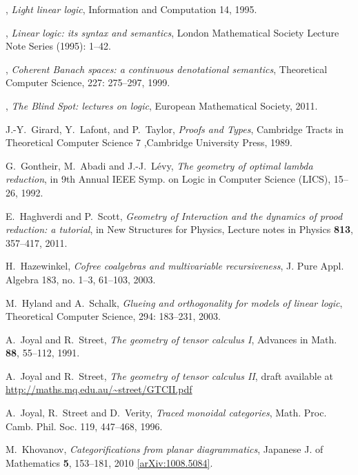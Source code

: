 \documentclass[english,letter paper,12pt,reqno]{article}
\theoremstyle{example}
\numberwithin{equation}{section}
\begin{document}
\begin{thebibliography}{BHLS03}
\bysame, \textsl{Light linear logic}, Information and Computation 14, 1995.

\bysame, \textsl{Linear logic: its syntax and semantics}, London Mathematical Society Lecture Note Series (1995): 1--42.

\bysame, \textsl{Coherent {B}anach spaces: a continuous denotational semantics}, Theoretical Computer Science, 227: 275--297, 1999.

\bysame, \textsl{The Blind Spot: lectures on logic}, European Mathematical Society, 2011.

J.-Y.~Girard, Y.~Lafont, and P.~Taylor, \textsl{Proofs and Types}, Cambridge Tracts in Theoretical Computer Science 7 ,Cambridge University Press, 1989.

G.~Gontheir, M.~Abadi and J.-J.~L\'{e}vy, \textsl{The geometry of optimal lambda reduction}, in 9th Annual IEEE Symp. on Logic in Computer Science (LICS), 15--26, 1992.
  
E.~Haghverdi and P.~Scott, \textsl{Geometry of {I}nteraction and the dynamics of prood reduction: a tutorial}, in New Structures for Physics, Lecture notes in Physics \textbf{813}, 357--417, 2011.
  
H.~Hazewinkel, \textsl{Cofree coalgebras and multivariable recursiveness}, J. Pure Appl. Algebra 183, no. 1--3, 61--103, 2003.

M.~Hyland and A.~Schalk, \textsl{Glueing and orthogonality for models of linear logic}, Theoretical Computer Science, 294: 183--231, 2003.

A.~Joyal and R.~Street, \textsl{The geometry of tensor calculus I}, Advances in Math. \textbf{88}, 55--112, 1991.

A.~Joyal and R.~Street, \textsl{The geometry of tensor calculus II}, 
draft available at 
\href{http://maths.mq.edu.au/~street/GTCII.pdf}{http://maths.mq.edu.au/\textasciitilde street/GTCII.pdf}

A.~Joyal, R.~Street and D.~Verity, \textsl{Traced monoidal categories}, Math. Proc. Camb. Phil. Soc. 119, 447--468, 1996.

M.~Khovanov, \textsl{Categorifications from planar diagrammatics}, Japanese J. of Mathematics \textbf{5}, 153--181, 2010 \href{http://arxiv.org/abs/1008.5084}{[arXiv:1008.5084]}.
  

\end{thebibliography}
\end{document}
